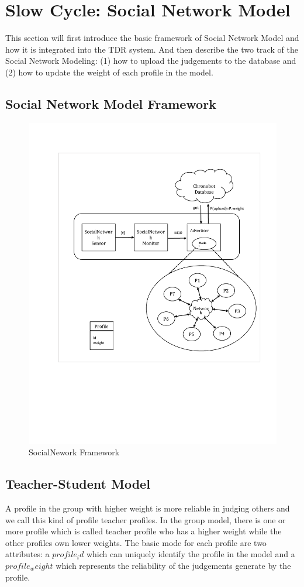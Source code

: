 \section{Slow Cycle: Social Network Model}\label{sec:slowCycle}


This section will first introduce the basic framework of Social Network Model and how it is integrated into the TDR system. And then describe the two track of the Social Network Modeling: (1) how to upload the judgements to the database and (2) how to update the weight of each profile in the model.

\subsection{Social Network Model Framework}


\begin{figure}[ht]
\includegraphics[width=0.9\columnwidth]{socialnetwork/SocialNetworkModel}
\caption{SocialNework Framework}
\label{fig:outliner}
\end{figure}


\subsection{Teacher-Student Model}
 A profile in the group with higher weight is more reliable in judging others and we call this kind of profile teacher profiles. In the group model, there is one or more profile which is called teacher profile who has a higher weight while the other profiles own lower weights. The basic mode for each profile are two attributes: a $profile_id$ which can uniquely identify the profile in the model and a $profile_weight$ which represents the reliability of the judgements generate by the profile.
 
